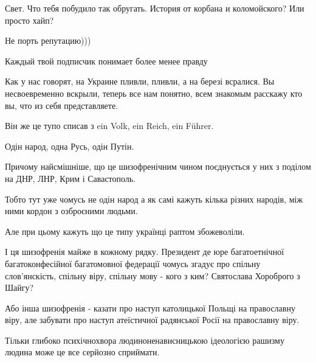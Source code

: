 \begin{itemize}
 

Свет. Что тебя побудило так обругать. История от корбана и коломойского? Или
просто хайп?

Не порть репутацию)))

Каждый твой подписчик понимает более менее правду

 

Как у нас говорят, на Украине пливли, пливли, а на березі всралися. Вы
несвоевременно вскрыли, теперь все нам понятно, всем знакомым расскажу кто вы,
что из себя представляете.

 

Він же це тупо списав з ein Volk, ein Reich, ein Führer.

Одін народ, одна Русь, одін Путін.

Причому найсмішніше, що це шизофренічним чином поєднується у них з поділом на
ДНР, ЛНР, Крим і Савастополь.

Тобто тут уже чомусь не одін народ а як самі кажуть кілька різних народів, між
ними кордон з озброєними людьми.

Але при цьому кажуть що це типу українці раптом збожеволіли.

І ця шизофренія майже в кожному рядку. Президент де юре багатоетнічної
багатоконфесійної багатомовної федерації чомусь згадує про спільну
слов'янскість, спільну віру, спільну мову - кого з ким? Святослава Хороброго з
Шайгу?

Або інша шизофренія - казати про наступ католицької Польщі на православну віру,
але забувати про наступ атеїстичної радянської Росії на православну віру.

Тільки глибоко психічнохвора людиноненависницькою ідеологією рашизму людина
може це все серйозно сприймати.


\end{itemize}
